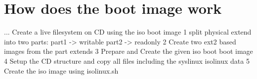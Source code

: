\section{How does the boot image work}

 ...
     Create a live filesystem on CD using the iso boot image
     1 split physical extend into two parts:
        part1 -> writable
        part2 -> readonly
     2 Create two ext2 based images from the part extends
     3 Prepare and Create the given iso boot boot image
     4 Setup the CD structure and copy all files
        including the syslinux isolinux data
     5 Create the iso image using isolinux.sh

